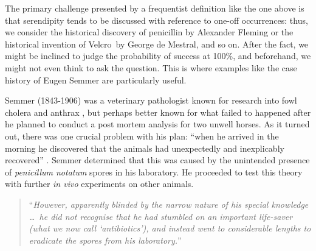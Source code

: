 
\bigskip




The primary challenge presented by a frequentist definition like the
one above is that serendipity tends to be discussed with reference to
one-off occurrences: thus, we consider the historical discovery of
penicillin by Alexander Fleming or the historical invention of
Velcro\texttrademark\ by George de Mestral, and so on.  After the
fact, we might be inclined to judge the probability of success at
100\%, and beforehand, we might not even think to ask the question.
This is where examples like the case history of Eugen Semmer are
particularly useful.

Semmer (1843-1906) was a veterinary pathologist known for research
into fowl cholera and anthrax \cite{saunders1980veterinary}, but
perhaps better known for what failed to happened after he planned to
conduct a post mortem analysis for two unwell horses.  As it turned
out, there was one crucial problem with his plan: ``when he arrived in
the morning he discovered that the animals had unexpectedly and
inexplicably recovered'' \cite[p.~75]{cropley2013creativity}.  Semmer
determined that this was caused by the unintended presence of
\emph{penicillum notatum} spores in his laboratory.  He proceeded to
test this theory with further \emph{in vivo} experiments on other
animals.

\begin{quote}
 ``\emph{However, apparently blinded by the
   narrow nature of his special knowledge {\upshape\ldots}\ he did not
   recognise that he had stumbled on an important life-saver (what we
   now call `antibiotics'), and instead went to considerable lengths to
   eradicate the spores from his laboratory.}'' \cite[p.~76]{cropley2013creativity}
\end{quote}
  
